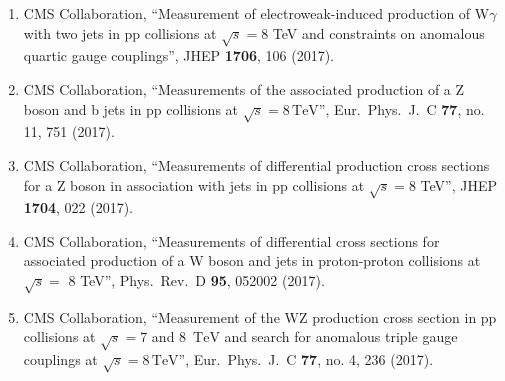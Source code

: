 \begin{itemize}
\begin{enumerate}
\item CMS Collaboration, ``Measurement of electroweak-induced production of W$\gamma$ with two jets in pp collisions at $ \sqrt{s}=8 $ TeV and constraints on anomalous quartic gauge couplings'', JHEP {\bf 1706}, 106 (2017).

\item CMS Collaboration, ``Measurements of the associated production of a Z boson and b jets in pp collisions at ${\sqrt{s}} = 8\,\text {TeV} $'', Eur.\ Phys.\ J.\ C {\bf 77}, no. 11, 751 (2017).

\item CMS Collaboration, ``Measurements of differential production cross sections for a Z boson in association with jets in pp collisions at $ \sqrt{s}=8 $ TeV'', JHEP {\bf 1704}, 022 (2017).

\item CMS Collaboration, ``Measurements of differential cross sections for associated production of a W boson and jets in proton-proton collisions at $\sqrt{s} =$ 8 TeV'', Phys.\ Rev.\ D {\bf 95}, 052002 (2017).

\item CMS Collaboration, ``Measurement of the WZ production cross section in pp collisions at $\sqrt{s} = 7$ and 8 $\,\text{TeV}$ and search for anomalous triple gauge couplings at $\sqrt{s} = 8\,\text{TeV} $'', Eur.\ Phys.\ J.\ C {\bf 77}, no. 4, 236 (2017).


\end{enumerate}
\end{itemize}
